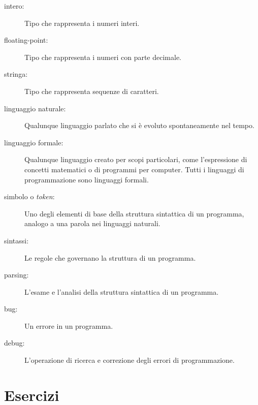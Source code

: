 \documentclass[10pt]{book}
\begin{document}
\begin{description}
\item[intero:] Tipo che rappresenta i numeri interi.

\item[floating-point:] Tipo che rappresenta i numeri con parte decimale.

\item[stringa:] Tipo che rappresenta sequenze di caratteri.

\item[linguaggio naturale:]  Qualunque linguaggio parlato che si è evoluto spontaneamente nel tempo.

\item[linguaggio formale:]  Qualunque linguaggio creato per scopi particolari, come l'espressione di concetti matematici o di programmi per computer. Tutti i linguaggi di programmazione sono linguaggi formali.

\item[simbolo o {\em token}:]  Uno degli elementi di base della struttura sintattica di un programma, analogo a una parola nei linguaggi naturali.

\item[sintassi:] Le regole che governano la struttura di un programma.

\item[parsing:] L'esame e l'analisi della struttura sintattica di un programma.

\item[bug:] Un errore in un programma.

\item[debug:] L'operazione di ricerca e correzione degli errori di programmazione.


\end{description}


\section{Esercizi}
\end{document}
